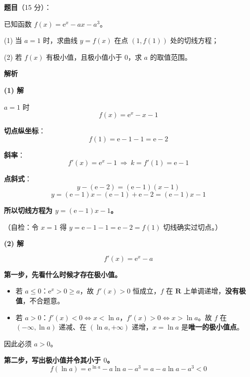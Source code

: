 \begin{answer}

\textbf{题目}（15 分）：

已知函数 $f(x)=\mathrm e^{x}-ax-a^{3}$。

  (1) 当 $a=1$ 时，求曲线 $y=f(x)$ 在点 $\left(1,f(1)\right)$ 处的切线方程；

  (2) 若 $f(x)$ 有极小值，且极小值小于 $0$，求 $a$ 的取值范围。

\textbf{解析}

\par\medskip

\textbf{(1) 解}

$a=1$ 时
\nopagebreak[4]
\[f(x)=\mathrm e^{x}-x-1\]

\textbf{切点纵坐标}：
\nopagebreak[4]
\[f(1)=\mathrm e-1-1=\mathrm e-2\]

\textbf{斜率}：
\nopagebreak[4]
\[f'(x)=\mathrm e^{x}-1\ \Longrightarrow\ k=f'(1)=\mathrm e-1\]

\textbf{点斜式}：
\nopagebreak[4]
\[y-(\mathrm e-2)=(\mathrm e-1)(x-1)\]
\nopagebreak[4]
\[y=(\mathrm e-1)x-(\mathrm e-1)+\mathrm e-2=(\mathrm e-1)x-1\]

\textbf{所以切线方程为 $y=(\mathrm e-1)x-1$。}

（自检：令 $x=1$ 得 $y=\mathrm e-1-1=\mathrm e-2=f(1)$  切线确实过切点。）

\par\medskip

\textbf{(2) 解}

\nopagebreak[4]
\[f'(x)=\mathrm e^{x}-a\]

\textbf{第一步，先看什么时候才存在极小值。}

\begin{itemize}
\item 若 $a\le0$：$\mathrm e^{x}>0\ge a$，故 $f'(x)>0$ 恒成立，$f$ 在 $\mathbf R$ 上单调递增，\textbf{没有极值}，不合题意。
\item 若 $a>0$：$f'(x)<0\iff x<\ln a$，$f'(x)>0\iff x>\ln a$。故 $f$ 在 $(-\infty,\ln a)$ 递减、在 $(\ln a,+\infty)$ 递增，$x=\ln a$ 是\textbf{唯一的极小值点}。
\end{itemize}

因此必须 $a>0$。

\textbf{第二步，写出极小值并令其小于 $0$。}
\nopagebreak[4]
\[f(\ln a)=\mathrm e^{\ln a}-a\ln a-a^{3}=a-a\ln a-a^{3}<0\]


\end{answer}
